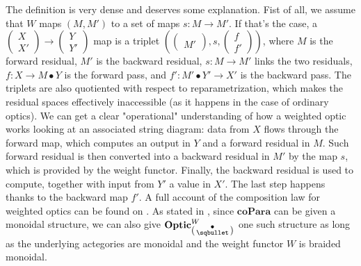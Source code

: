 \documentclass[12pt,a4paper,openright,twoside]{report}
\theoremstyle{plain}
\theoremstyle{definition}
\begin{document}
The definition is very dense and deserves some explanation. Fist of all, we assume that $W$ maps $(M,M')$ to a set of maps $s: M \to M'$. If that's the case, a $\left(\begin{smallmatrix}X\\X'\end{smallmatrix}\right) \to \left(\begin{smallmatrix}Y\\Y'\end{smallmatrix}\right)$ map is a triplet $\left(\left(\begin{smallmatrix}\\M'\end{smallmatrix}\right),s,\left(\begin{smallmatrix}f\\f'\end{smallmatrix}\right)\right)$, where $M$ is the forward residual, $M'$ is the backward residual, $s: M \to M'$ links the two residuals, $f: X \to M \bullet Y$ is the forward pass, and $f': M' \bullet Y' \to X'$ is the backward pass.
The triplets are also quotiented with respect to reparametrization, which makes the residual spaces effectively inaccessible (as it happens in the case of ordinary optics). We can get a clear "operational" understanding of how a weighted optic works looking at an associated string diagram: data from $X$ flows through the forward map, which computes an output in $Y$ and a forward residual in $M$. Such forward residual is then converted into a backward residual in $M'$ by the map $s$, which is provided by the weight functor. Finally, the backward residual is used to compute, together with input from $Y'$ a value in $X'$. The last step happens thanks to the backward map $f'$. A full account of the composition law for weighted optics can be found on \cite{gavranovic2024fundamental}.
As stated in \cite{gavranovic2024fundamental}, since $\mathbf{coPara}$ can be given a monoidal structure, we can also give $\mathbf{Optic}^W_{\left(\begin{smallmatrix}\bullet\\\sqbullet\end{smallmatrix}\right)}$ one such structure as long as the underlying actegories are monoidal and the weight functor $W$ is braided monoidal.
\end{document}
